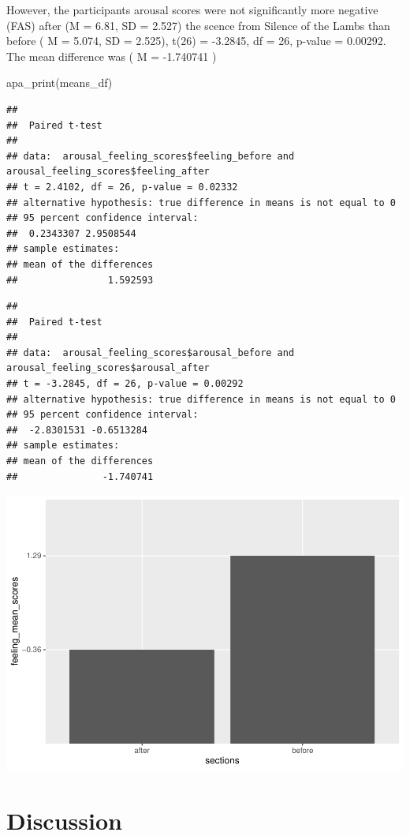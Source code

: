 \documentclass[
  english,
  man]{apa6}
\begin{document}
However, the participants arousal scores were not significantly more negative (FAS) after (M = 6.81, SD = 2.527) the scence from Silence of the Lambs than before ( M = 5.074, SD = 2.525), t(26) = -3.2845, df = 26, p-value = 0.00292. The mean difference was ( M = -1.740741 )

apa\_print(means\_df)

\begin{verbatim}
## 
##  Paired t-test
## 
## data:  arousal_feeling_scores$feeling_before and arousal_feeling_scores$feeling_after
## t = 2.4102, df = 26, p-value = 0.02332
## alternative hypothesis: true difference in means is not equal to 0
## 95 percent confidence interval:
##  0.2343307 2.9508544
## sample estimates:
## mean of the differences 
##                1.592593
\end{verbatim}

\begin{verbatim}
## 
##  Paired t-test
## 
## data:  arousal_feeling_scores$arousal_before and arousal_feeling_scores$arousal_after
## t = -3.2845, df = 26, p-value = 0.00292
## alternative hypothesis: true difference in means is not equal to 0
## 95 percent confidence interval:
##  -2.8301531 -0.6513284
## sample estimates:
## mean of the differences 
##               -1.740741
\end{verbatim}

\includegraphics{APAReport_files/figure-latex/unnamed-chunk-1-1.pdf}

\hypertarget{discussion}{%
\section{Discussion}\label{discussion}}
\end{document}
